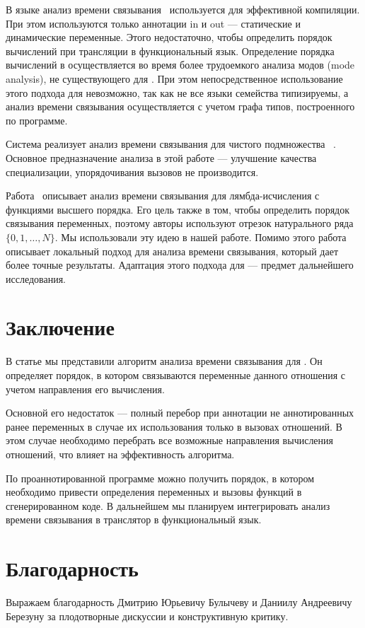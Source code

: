 \documentclass[conference,american,russian]{IEEEtran}
\begin{document}
В языке \mercury{} анализ времени связывания~\cite{vanhoof2004binding} используется для эффективной компиляции. 
При этом используются только аннотации in и out --- статические и динамические переменные. 
Этого недостаточно, чтобы определить порядок вычислений при трансляции в функциональный язык.
Определение порядка вычислений в \mercury{} осуществляется во время более трудоемкого анализа модов (mode analysis), не существующего для \miniKanren{}. 
При этом непосредственное использование этого подхода для \miniKanren{} невозможно, так как не все языки семейства типизируемы, а анализ времени связывания \mercury{} осуществляется с учетом графа типов, построенного по программе. 

Система \logen{} реализует анализ времени связывания для чистого подмножества \prolog{}~\cite{leuschel2004prolog}.
Основное предназначение анализа в этой работе --- улучшение качества специализации, упорядочивания вызовов не производится. 

Работа~\cite{Thiemann1997AUF} описывает анализ времени связывания для лямбда-исчисления с функциями высшего порядка. 
Его цель также в том, чтобы определить порядок связывания переменных, поэтому авторы используют отрезок натурального ряда $\{ 0, 1, \dots, N\}$. 
Мы использовали эту идею в нашей работе. 
Помимо этого работа~\cite{Thiemann1997AUF} описывает локальный подход для анализа времени связывания, который дает более точные результаты. 
Адаптация этого подхода для \miniKanren{} --- предмет дальнейшего исследования. 

\section{Заключение}\label{conclusion}

В статье мы представили алгоритм анализа времени связывания для \miniKanren{}. 
Он определяет порядок, в котором связываются переменные данного отношения с учетом направления его вычисления.  

Основной его недостаток --- полный перебор при аннотации не аннотированных ранее переменных в случае их использования только в вызовах отношений. 
В этом случае необходимо перебрать все возможные направления вычисления отношений, что влияет на эффективность алгоритма.

По проаннотированной программе можно получить порядок, в котором необходимо привести определения переменных и вызовы функций в сгенерированном коде. В дальнейшем мы планируем интегрировать анализ времени связывания в транслятор в функциональный язык. 

\section*{Благодарность}

Выражаем благодарность Дмитрию Юрьевичу Булычеву и Даниилу Андреевичу Березуну за плодотворные дискуссии и конструктивную критику.



\end{document}
